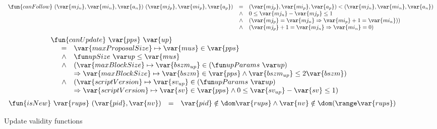 \begin{figure}[htb]
  \begin{equation}
    \label{eq:func:can-follow}
    \begin{array}{r c l}
      \fun{canFollow}~(\var{mj_n}, \var{mi_n}, \var{a_n})~(\var{mj_p}, \var{mi_p}, \var{a_p})
      & = & (\var{mj_p}, \var{mi_p}, \var{a_p}) < (\var{mj_n}, \var{mi_n}, \var{a_n})\\
      & \wedge & 0 \leq \var{mj_n} - \var{mj_p} \leq 1\\
      & \wedge & (\var{mj_p} = \var{mj_n} \Rightarrow \var{mi_p} + 1 = \var{mi_n}))\\
      & \wedge & (\var{mj_p} + 1 = \var{mj_n} \Rightarrow \var{mi_n} = 0)
    \end{array}
  \end{equation}
  \nextdef
  \begin{equation}
    \label{eq:func:can-update}
    \begin{array}{l}
      \fun{canUpdate}~\var{pps}~\var{up}\\
      {\begin{array}{r c l}
         & = & \var{maxProposalSize} \mapsto \var{mus} \in \var{pps}\\
         & \wedge & \upSize{up} \leq \var{mus}\\
         & \wedge & (\var{maxBlockSize} \mapsto \var{bszm_{up}} \in (\upParams{up})\\
         & & \Rightarrow \var{maxBlockSize} \mapsto \var{bszm} \in \var{pps}
             \wedge  \var{bszm_{up}} \leq 2\var{bszm})\\
         & \wedge & (\var{scriptVersion} \mapsto \var{sv_{up}} \in (\upParams{up}) \\
         & & \Rightarrow \var{scriptVersion} \mapsto \var{sv} \in \var{pps}
             \wedge  0 \leq \var{sv_{up}} - \var{sv} \leq 1)
       \end{array}}
    \end{array}
  \end{equation}
  \nextdef
  \begin{equation}
    \label{eq:func:is-new}
    \begin{array}{r c l}
      \fun{isNew}~\var{rups}~(\var{pid}, \var{nv})
      & = &  \var{pid} \notin \dom \var{rups}
            \wedge \var{nv} \notin \dom (\range \var{rups})\\
    \end{array}
  \end{equation}
  \caption{Update validity functions}
\end{figure}

